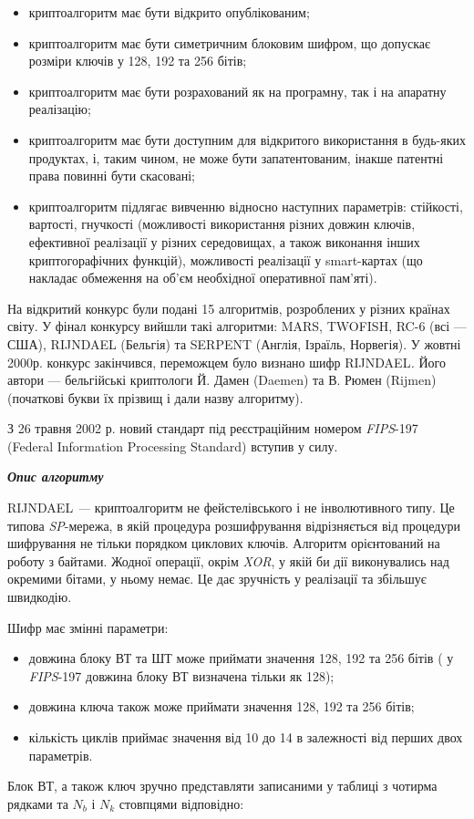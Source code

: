 \liststyleWWviiiNumxxvi
\begin{itemize}
\item криптоалгоритм має бути відкрито опублікованим;
\item криптоалгоритм має бути симетричним блоковим шифром,  що допускає розміри
ключів у 128, 192 та 256 бітів;
\item криптоалгоритм має бути розрахований як на програмну, так і на апаратну
реалізацію;
\item криптоалгоритм має бути доступним для відкритого використання в будь-яких
продуктах, і, таким чином, не може бути запатентованим, інакше патентні права
повинні бути скасовані;
\item криптоалгоритм підлягає вивченню відносно наступних параметрів: стійкості,
вартості, гнучкості (можливості використання різних довжин ключів, ефективної
реалізації у різних середовищах, а також виконання інших криптогорафічних
функцій), можливості реалізації у smart{}-картах (що накладає обмеження на
об’єм необхідної оперативної пам’яті).
\end{itemize}
На відкритий конкурс були подані 15 алгоритмів, розроблених у різних країнах
світу. У фінал конкурсу вийшли такі алгоритми: MARS, TWOFISH, RC{}-6 (всі ---
США), RIJNDAEL (Бельгія) та SERPENT\textit{ }(Англія, Ізраїль, Норвегія). У
жовтні 2000р. конкурс закінчився, переможцем було визнано шифр
RIJNDAEL\textit{.} Його автори --- бельгійські криптологи Й. Дамен (Daemen) та В.
Рюмен (Rijmen) (початкові букви їх прізвищ і дали назву алгоритму). 

З 26 травня 2002 р. новий стандарт під реєстраційним номером 
\textit{FIPS}{}-197 (Federal Information Processing Standard) вступив у силу.


\bigskip


\bigskip

{\centering\bfseries\itshape
Опис алгоритму
\par}


\bigskip

RIJNDAEL\textit{ --- }криптоалгоритм не фейстелівського і не інволютивного типу.
Це типова \textit{SP}{}-мережа, в якій процедура розшифрування відрізняється
від процедури шифрування не тільки порядком циклових ключів. Алгоритм
орієнтований на роботу з байтами. Жодної операції, окрім \textit{XOR}, у якій
би дії виконувались над окремими бітами, у ньому немає. Це дає зручність у
реалізації та збільшує швидкодію.

Шифр має змінні параметри:

\liststyleWWviiiNumxxxviii
\begin{itemize}
\item довжина блоку ВТ та ШТ може приймати значення 128, 192 та 256 бітів  ( у
\textit{FIPS}{}-197 довжина блоку ВТ визначена тільки як 128);
\item довжина ключа також може приймати значення 128, 192 та 256 бітів;
\item кількість циклів приймає значення від 10 до 14 в залежності від перших
двох параметрів.
\end{itemize}
Блок ВТ, а також ключ зручно представляти записаними у таблиці з чотирма рядками
та  $N_b$ і  $N_k$ стовпцями відповідно:


